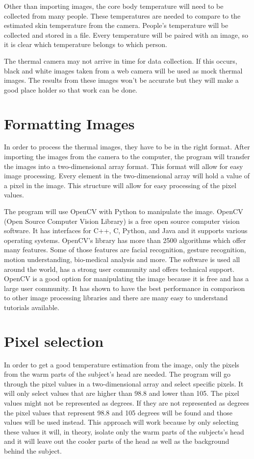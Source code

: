 ﻿\documentclass[onecolumn, draftclsnofoot,10pt, compsoc]{IEEEtran}
\begin{document}
Other than importing images, the core body temperature will need to be collected from many people. These temperatures are needed to compare to the estimated skin temperature from the camera. People’s temperature will be collected and stored in a file. Every temperature will be paired with an image, so it is clear which temperature belongs to which person. 

The thermal camera may not arrive in time for data collection. If this occurs, black and white images taken from a web camera will be used as mock thermal images. The results from these images won't be accurate but they will make a good place holder so that work can be done. 


\section{Formatting Images}

In order to process the thermal images, they have to be in the right format. After importing the images from the camera to the computer, the program will transfer the images into a two-dimensional array format. This format will allow for easy image processing. Every element in the two-dimensional array will hold a value of a pixel in the image. This structure will allow for easy processing of the pixel values. 

The program will use OpenCV with Python to manipulate the image. OpenCV (Open Source Computer Vision Library) is a free open source computer vision software. It has interfaces for C++, C, Python, and Java and it supports various operating systems. OpenCV’s library has more than 2500 algorithms which offer many features. Some of those features are facial recognition, gesture recognition, motion understanding, bio-medical analysis and more. The software is used all around the world, has a strong user community and offers technical support. OpenCV is a good option for manipulating the image because it is free and has a large user community. It has shown to have the best performance in comparison to other image processing libraries and there are many easy to understand tutorials available.\cite{ClaudeTech}

\section{Pixel selection}
In order to get a good temperature estimation from the image, only the pixels from the warm parts of the subject's head are needed. The program will go through the pixel values in a two-dimensional array and select specific pixels. It will only select values that are higher than 98.8 and lower than 105. The pixel values might not be represented as degrees. If they are not represented as degrees the pixel values that represent 98.8 and 105 degrees will be found and those values will be used instead. This approach will work because by only selecting these values it will,  in theory, isolate only the warm parts of the subjects’s head and it will leave out the cooler parts of the head as well as the background behind the subject. 
\end{document}
